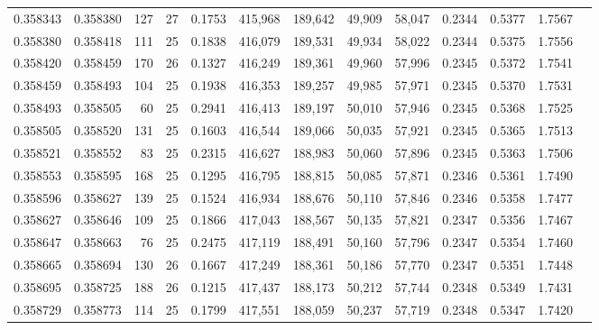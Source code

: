 \begin{tabular}{rrrrrrrrrrrrr}
0.358343 & 0.358380 &   127 &  27 &                                     0.1753 & 415,968 & 189,642 &  49,909 &  58,047 & 0.2344 & 0.5377 & 1.7567 \\
0.358380 & 0.358418 &   111 &  25 &                                     0.1838 & 416,079 & 189,531 &  49,934 &  58,022 & 0.2344 & 0.5375 & 1.7556 \\
0.358420 & 0.358459 &   170 &  26 &                                     0.1327 & 416,249 & 189,361 &  49,960 &  57,996 & 0.2345 & 0.5372 & 1.7541 \\
0.358459 & 0.358493 &   104 &  25 &                                     0.1938 & 416,353 & 189,257 &  49,985 &  57,971 & 0.2345 & 0.5370 & 1.7531 \\
0.358493 & 0.358505 &    60 &  25 &                                     0.2941 & 416,413 & 189,197 &  50,010 &  57,946 & 0.2345 & 0.5368 & 1.7525 \\
0.358505 & 0.358520 &   131 &  25 &                                     0.1603 & 416,544 & 189,066 &  50,035 &  57,921 & 0.2345 & 0.5365 & 1.7513 \\
0.358521 & 0.358552 &    83 &  25 &                                     0.2315 & 416,627 & 188,983 &  50,060 &  57,896 & 0.2345 & 0.5363 & 1.7506 \\
0.358553 & 0.358595 &   168 &  25 &                                     0.1295 & 416,795 & 188,815 &  50,085 &  57,871 & 0.2346 & 0.5361 & 1.7490 \\
0.358596 & 0.358627 &   139 &  25 &                                     0.1524 & 416,934 & 188,676 &  50,110 &  57,846 & 0.2346 & 0.5358 & 1.7477 \\
0.358627 & 0.358646 &   109 &  25 &                                     0.1866 & 417,043 & 188,567 &  50,135 &  57,821 & 0.2347 & 0.5356 & 1.7467 \\
0.358647 & 0.358663 &    76 &  25 &                                     0.2475 & 417,119 & 188,491 &  50,160 &  57,796 & 0.2347 & 0.5354 & 1.7460 \\
0.358665 & 0.358694 &   130 &  26 &                                     0.1667 & 417,249 & 188,361 &  50,186 &  57,770 & 0.2347 & 0.5351 & 1.7448 \\
0.358695 & 0.358725 &   188 &  26 &                                     0.1215 & 417,437 & 188,173 &  50,212 &  57,744 & 0.2348 & 0.5349 & 1.7431 \\
0.358729 & 0.358773 &   114 &  25 &                                     0.1799 & 417,551 & 188,059 &  50,237 &  57,719 & 0.2348 & 0.5347 & 1.7420 \\

\end{tabular}
